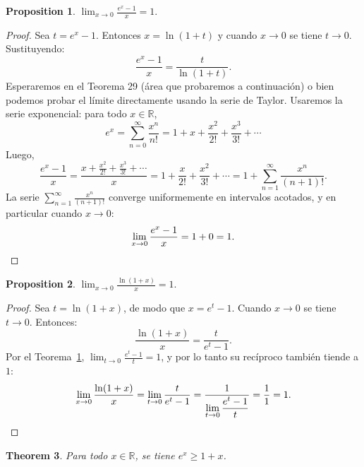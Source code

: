 \documentclass[11pt,a4paper]{article}
\theoremstyle{plain}
\newtheorem{theorem}{Theorem}[section]
\newtheorem{proposition}[theorem]{Proposition}
\theoremstyle{definition}
\begin{document}
\begin{proposition}\label{prop:28}
$\displaystyle\lim_{x \to 0} \frac{e^x - 1}{x} = 1.$
\end{proposition}

\begin{proof}
Sea $t = e^x - 1$. Entonces $x = \ln(1+t)$ y cuando $x \to 0$ se tiene $t \to 0$. Sustituyendo:
\[
\frac{e^x - 1}{x} = \frac{t}{\ln(1+t)}.
\]
Esperaremos en el Teorema 29 (\'area que probaremos a continuaci\'on) o bien podemos probar el l\'imite directamente usando la serie de Taylor. Usaremos la serie exponencial: para todo $x \in \mathbb{R}$,
\[
e^x = \sum_{n=0}^{\infty} \frac{x^n}{n!} = 1 + x + \frac{x^2}{2!} + \frac{x^3}{3!} + \cdots
\]
Luego,
\[
\frac{e^x - 1}{x} = \frac{x + \frac{x^2}{2!} + \frac{x^3}{3!} + \cdots}{x} = 1 + \frac{x}{2!} + \frac{x^2}{3!} + \cdots = 1 + \sum_{n=1}^{\infty} \frac{x^n}{(n+1)!}.
\]
La serie $\sum_{n=1}^{\infty} \frac{x^n}{(n+1)!}$ converge uniformemente en intervalos acotados, y en particular cuando $x \to 0$:
\[
\lim_{x \to 0} \frac{e^x - 1}{x} = 1 + 0 = 1. \qedhere
\]
\end{proof}

\begin{proposition}\label{prop:29}
$\displaystyle\lim_{x \to 0} \frac{\ln(1 + x)}{x} = 1.$
\end{proposition}

\begin{proof}
Sea $t = \ln(1+x)$, de modo que $x = e^t - 1$. Cuando $x \to 0$ se tiene $t \to 0$. Entonces:
\[
\frac{\ln(1+x)}{x} = \frac{t}{e^t - 1}.
\]
Por el Teorema~\ref{prop:28}, $\lim_{t \to 0} \frac{e^t - 1}{t} = 1$, y por lo tanto su rec\'iproco tambi\'en tiende a $1$:
\[
\lim_{x \to 0} \frac{\ln(1+x)}{x} = \lim_{t \to 0} \frac{t}{e^t - 1} = \frac{1}{\displaystyle\lim_{t \to 0}\frac{e^t - 1}{t}} = \frac{1}{1} = 1. \qedhere
\]
\end{proof}

\begin{theorem}\label{thm:30}
Para todo $x \in \mathbb{R}$, se tiene $e^x \geq 1 + x$.
\end{theorem}
\end{document}
